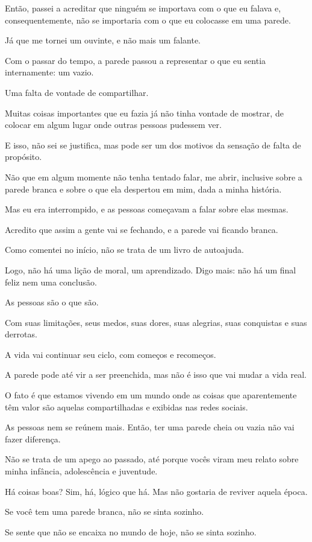 Então, passei a acreditar que ninguém se importava com o que eu falava e, consequentemente, não se importaria com o que eu colocasse em uma parede.

Já que me tornei um ouvinte, e não mais um falante.

Com o passar do tempo, a parede passou a representar o que eu sentia internamente: um vazio.

Uma falta de vontade de compartilhar.

Muitas coisas importantes que eu fazia já não tinha vontade de mostrar, de colocar em algum lugar onde outras pessoas pudessem ver.

E isso, não sei se justifica, mas pode ser um dos motivos da sensação de falta de propósito.

Não que em algum momente não tenha tentado falar, me abrir, inclusive sobre a parede branca e sobre o que ela despertou em mim, dada a minha história.

Mas eu era interrompido, e as pessoas começavam a falar sobre elas mesmas.

Acredito que assim a gente vai se fechando, e a parede vai ficando branca.

Como comentei no início, não se trata de um livro de autoajuda.

Logo, não há uma lição de moral, um aprendizado. Digo mais: não há um final feliz nem uma conclusão.

As pessoas são o que são.

Com suas limitações, seus medos, suas dores, suas alegrias, suas conquistas e suas derrotas.

A vida vai continuar seu ciclo, com começos e recomeços.

A parede pode até vir a ser preenchida, mas não é isso que vai mudar a vida real.

O fato é que estamos vivendo em um mundo onde as coisas que aparentemente têm valor são aquelas compartilhadas e exibidas nas redes sociais.

As pessoas nem se reúnem mais. Então, ter uma parede cheia ou vazia não vai fazer diferença.

Não se trata de um apego ao passado, até porque vocês viram meu relato sobre minha infância, adolescência e juventude.

Há coisas boas? Sim, há, lógico que há. Mas não gostaria de reviver aquela época.

Se você tem uma parede branca, não se sinta sozinho.

Se sente que não se encaixa no mundo de hoje, não se sinta sozinho.

